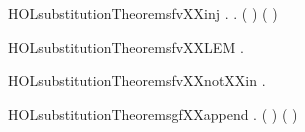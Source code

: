 \newcommand{\HOLsubstitutionTheoremsfvXXind}{\UseVerbatim{HOLsubstitutionTheoremsfvXXind}}
\begin{SaveVerbatim}{HOLsubstitutionTheoremsfvXXinj}
\HOLTokenTurnstile{} \HOLSymConst{\HOLTokenForall{}} .
        \HOLSymConst{\HOLTokenImp{}}
     \HOLSymConst{\HOLTokenForall{}} .  \HOLConst{\HOLTokenIn{}}  \HOLSymConst{\HOLTokenConj{}}  \HOLConst{\HOLTokenIn{}}  \HOLSymConst{\HOLTokenImp{}} (   \HOLSymConst{=}   ) \HOLSymConst{\HOLTokenImp{}} ( \HOLSymConst{=} )
\end{SaveVerbatim}
\newcommand{\HOLsubstitutionTheoremsfvXXinj}{\UseVerbatim{HOLsubstitutionTheoremsfvXXinj}}
\begin{SaveVerbatim}{HOLsubstitutionTheoremsfvXXLEM}
\HOLTokenTurnstile{} \HOLSymConst{\HOLTokenForall{}} .   \HOLTokenLeftbrace{}\HOLTokenRightbrace{} \HOLSymConst{=} \HOLTokenLeftbrace{}  \HOLTokenRightbrace{}
\end{SaveVerbatim}
\newcommand{\HOLsubstitutionTheoremsfvXXLEM}{\UseVerbatim{HOLsubstitutionTheoremsfvXXLEM}}
\begin{SaveVerbatim}{HOLsubstitutionTheoremsfvXXnotXXin}
\HOLTokenTurnstile{} \HOLSymConst{\HOLTokenForall{}}   .
        \HOLSymConst{\HOLTokenConj{}}  \HOLConst{\HOLTokenSubset{}}  \HOLSymConst{\HOLTokenConj{}}  \HOLConst{\HOLTokenIn{}}  \HOLSymConst{\HOLTokenConj{}}  \HOLConst{\HOLTokenNotIn{}}  \HOLSymConst{\HOLTokenImp{}}    \HOLConst{\HOLTokenNotIn{}}   
\end{SaveVerbatim}
\newcommand{\HOLsubstitutionTheoremsfvXXnotXXin}{\UseVerbatim{HOLsubstitutionTheoremsfvXXnotXXin}}
\begin{SaveVerbatim}{HOLsubstitutionTheoremsgfXXappend}
\HOLTokenTurnstile{} \HOLSymConst{\HOLTokenForall{}}  .  ( \HOLSymConst{++} )  \HOLSymConst{=}   (  )
\end{SaveVerbatim}
